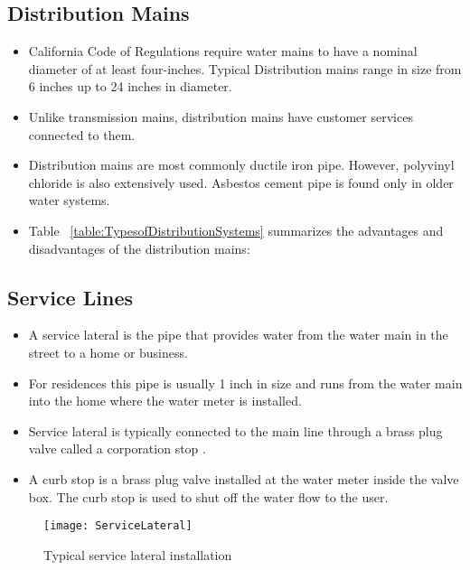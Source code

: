\subsection{Distribution Mains}
\begin{itemize}
\item California Code of Regulations require water mains to have a nominal diameter of at least four-inches.  Typical Distribution mains range in size from 6
inches up to 24 inches in diameter. 
\item Unlike transmission mains, distribution mains have customer services connected to them. 
\item Distribution mains are most commonly ductile iron pipe. However, polyvinyl chloride is also extensively used. Asbestos cement pipe is found only in older water systems.

\item Table ~\ref{table:TypesofDistributionSystems} summarizes the advantages and disadvantages of the distribution mains:
\end{itemize}

\subsection{Service Lines}
\begin{itemize}
\item A service lateral is the pipe that provides water from the water main in the street to a home or business. 
\item For residences this pipe is usually 1 inch in size and runs from the water main into the home where the water meter is installed. 
\item Service lateral is typically connected to the main line through a brass plug valve called a corporation stop . 
\item A curb stop  is a brass plug valve installed at the water meter inside the valve box.  The curb stop is used to shut off the water flow to the user.
\end{itemize}
\begin{figure}[h]
\begin{center}
        \texttt{[image: ServiceLateral]}
        \caption{Typical service lateral installation}
\end{center}
\end{figure}


